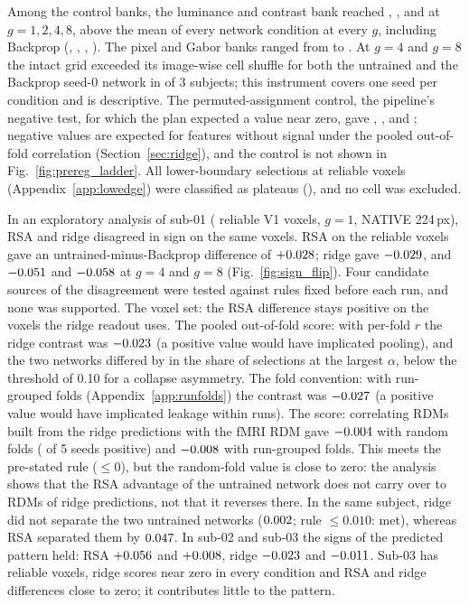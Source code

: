 Among the control banks, the luminance and contrast bank reached
\PreregCtlLumcontrastMeanGOne, \PreregCtlLumcontrastMeanGTwo,
\PreregCtlLumcontrastMeanGFour{} and \PreregCtlLumcontrastMeanGEight{} at
$g = 1, 2, 4, 8$, above the mean of every network condition at every $g$, including
Backprop (\PreregCondBpGOne, \PreregCondBpGTwo, \PreregCondBpGFour, \PreregCondBpGEight).
The pixel and Gabor banks ranged from \PreregCtlGaborMeanGTwo{} to
\PreregCtlPixelsMeanGFour. At $g = 4$ and $g = 8$ the intact grid exceeded its
image-wise cell shuffle for both the untrained and the Backprop seed-0 network in
\PreregShuffleWinSubjects{} of 3 subjects; this instrument covers one seed per condition
and is descriptive. The permuted-assignment control, the pipeline's negative test, for
which the plan expected a value near zero, gave \PreregCtlPermutedMeanGOne,
\PreregCtlPermutedMeanGTwo, \PreregCtlPermutedMeanGFour{} and
\PreregCtlPermutedMeanGEight; negative values are expected for features without
signal under the pooled out-of-fold correlation (Section~\ref{sec:ridge}), and the
control is not shown in Fig.~\ref{fig:prereg_ladder}. All
\PreregLowEdgeHits{} lower-boundary selections at reliable voxels (Appendix~\ref{app:lowedge}) were classified as
plateaus (\PreregLowEdgePlateau), and no cell was excluded.

In an exploratory analysis of sub-01 (\NReliableSubOne{} reliable V1 voxels, $g = 1$,
NATIVE 224\,px), RSA and ridge disagreed in sign on the same voxels. RSA on the reliable
voxels gave an untrained-minus-Backprop difference of $+0.028$; ridge gave
$-0.029$, and $-0.051$ and $-0.058$ at $g = 4$ and $g = 8$
(Fig.~\ref{fig:sign_flip}). Four candidate sources of the disagreement were tested
against rules fixed before each run, and none was supported. The voxel set: the RSA
difference stays positive on the voxels the ridge readout uses. The pooled out-of-fold
score: with per-fold $r$ the ridge contrast was $-0.023$ (a positive value would
have implicated pooling), and the two networks differed by \ETwoHiFracDiff{} in the share
of selections at the largest $\alpha$, below the threshold of 0.10 for a collapse
asymmetry. The fold convention: with run-grouped folds (Appendix~\ref{app:runfolds}) the contrast was
$-0.027$ (a positive value would have implicated leakage within runs). The
score: correlating RDMs built from the ridge predictions with the fMRI RDM gave
$-0.004$ with random folds (\EFourEncPosSeedsRandom{} of 5 seeds
positive) and $-0.008$ with run-grouped folds. This meets the pre-stated rule
($\leq 0$), but the random-fold value is close to zero: the analysis shows that the RSA
advantage of the untrained network does not carry over to RDMs of ridge predictions, not
that it reverses there. In
the same subject, ridge did not separate the two untrained networks
($0.002$; rule $\leq 0.010$: met), whereas RSA separated them by
$0.047$. In sub-02 and sub-03 the signs of the predicted pattern held: RSA
$+0.056$ and $+0.008$, ridge $-0.023$ and
$-0.011$. Sub-03 has \NReliableSubThree{} reliable voxels, ridge scores near zero in every condition and RSA and ridge differences close to zero; it contributes little to the pattern.
